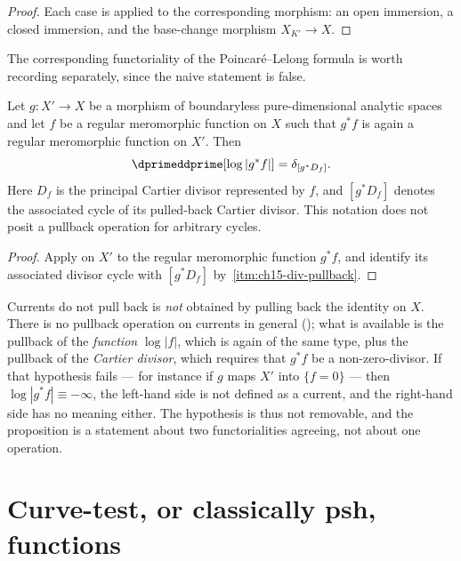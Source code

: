 \begin{proof}
Each case is  applied to the corresponding
morphism: an open immersion, a closed immersion, and the base-change morphism
$X_{K'}\to X$.
\end{proof}

The corresponding functoriality of the Poincar\'e--Lelong formula is worth
recording separately, since the naive statement is false.

\begin{proposition}
\label{prop:ch15-pl-pullback}
Let $g:X'\to X$ be a morphism of boundaryless pure-dimensional analytic
spaces and let $f$ be a regular meromorphic function on $X$ such that $g^*f$
is again a regular meromorphic function on $X'$.  Then
\[
 \dprimeddprime[\log|g^*f|]=\delta_{[g^*D_f]} .
\]
Here $D_f$ is the principal Cartier divisor represented by $f$, and
$[g^*D_f]$ denotes the associated cycle of its pulled-back Cartier divisor.
This notation does not posit a pullback operation for arbitrary cycles.
\end{proposition}

\begin{proof}
Apply  on $X'$ to the regular meromorphic
function $g^*f$, and identify its associated divisor cycle with $[g^*D_f]$
by
\,\cref{itm:ch15-div-pullback}.
\end{proof}

\begin{warning}{Currents do not pull back}
 is \emph{not} obtained by pulling back the
identity on $X$.  There is no pullback operation on currents in general
(); what is available is the pullback of the
\emph{function} $\log|f|$, which is again of the same type, plus the pullback
of the \emph{Cartier divisor}, which requires that $g^*f$ be a
non-zero-divisor.  If that hypothesis fails --- for instance if $g$ maps
$X'$ into $\{f=0\}$ --- then $\log|g^*f|\equiv-\infty$, the left-hand side is
not defined as a current, and the right-hand side has no meaning either.
The hypothesis is thus not removable, and the proposition is a statement
about two functorialities agreeing, not about one operation.
\end{warning}

\section{Curve-test, or classically psh, functions}
\label{sec:ch15-classical}

